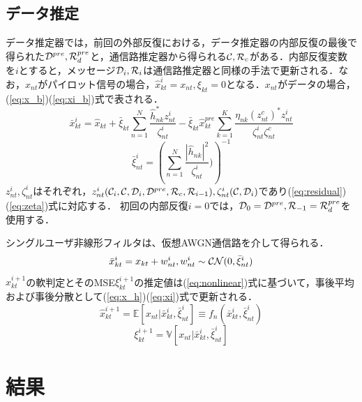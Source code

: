 \documentclass{jarticle}
\begin{document}
\subsection{データ推定}
データ推定器では，前回の外部反復における，データ推定器の内部反復の最後で得られた${\cal D}^{pre},{\cal R}_{d}^{pre}$と，通信路推定器から得られる${\cal C},{\cal R}_{c}$がある．内部反復変数を$i$とすると，メッセージ${\cal D}_{i},{\cal R}_{i}$は通信路推定器と同様の手法で更新される．なお，$x_{nt}$がパイロット信号の場合，$\hat{x}_{kt}^{i}={x}_{nt},\xi_{kt}=0$となる．$x_{nt}$がデータの場合，(\ref{eq:x_b})(\ref{eq:xi_b})式で表される．
\begin{equation}
    \label{eq:x_b}
    \bar{x}_{kt}^{i} = \hat{x}_{kt} + \bar{\xi}_{kt}\sum_{n=1}^{N}\frac{\hat{h}^{*}_{nk}z^{i}_{nt}}{\zeta_{nt}^{i}} - \bar{\xi}_{kt}\hat{x}^{pre}_{kt}\sum_{k=1}^{K}
    \frac{\eta_{nk}(z^{c}_{nt})^{*}z_{nt}^{i}}
        {\zeta_{nt}^{i}\zeta_{nt}^{c}}
\end{equation}
\begin{equation}
    \label{eq:xi_b}
    \bar{\xi}_{nt}^{i} = \left(\sum_{n=1}^{N}\frac{|\hat{h}_{nk}|^{2}}{\zeta_{nt}^{i}})\right)^{-1}
\end{equation}
$z^{i}_{nt},\zeta_{nt}^{i}$はそれぞれ，$z^{i}_{nt}({\cal C}_{i},{\cal C},{\cal D}_{i},{\cal D}^{pre},{\cal R}_{c},{\cal R}_{i-1}),\zeta_{nt}^{i}({\cal C},{\cal D}_{i})$であり(\ref{eq:residual})(\ref{eq:zeta})式に対応する．
初回の内部反復$i=0$では，${\cal D}_{0}={\cal D}^{pre},{\cal R}_{-1}={\cal R}_{d}^{pre}$を使用する．

シングルユーザ非線形フィルタは、仮想AWGN通信路を介して得られる．
\begin{equation}
    \label{eq:nonlinear}
    \bar{x}_{kt}^{i} = x_{kt} + w_{nt}^{i} , w_{nt}^{i}\sim{\cal CN}(0,\bar{\xi}_{nt}^{i})
\end{equation}
$\hat{x}_{kt}^{i+1}$の軟判定とそのMSE$\xi_{kt}^{i+1}$の推定値は(\ref{eq:nonlinear})式に基づいて，事後平均および事後分散として(\ref{eq:x_h})(\ref{eq:xi})式で更新される．
\begin{equation}
    \label{eq:x_h}
    \hat{x}_{kt}^{i+1} = \mathbb{E}[x_{nt}|\bar{x}_{kt}^{i},\bar{\xi}_{nt}^{i}] \equiv f_{n}(\bar{x}_{kt}^{i},\bar{\xi}_{nt}^{i})
\end{equation}
\begin{equation}
    \label{eq:xi}
    \xi_{kt}^{i+1} =  \mathbb{V}[x_{nt}|\bar{x}_{kt}^{i},\bar{\xi}_{nt}^{i}]
\end{equation}


\section{結果}
\end{document}
